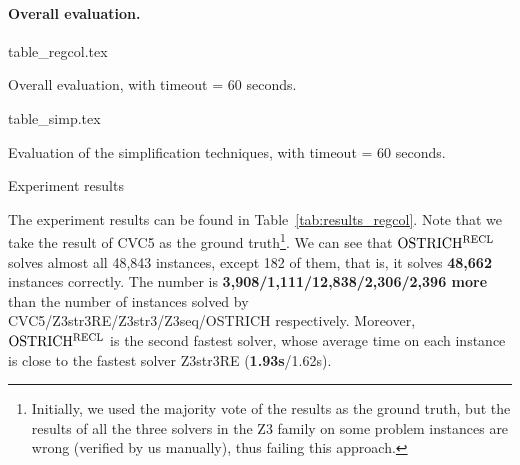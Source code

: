 \paragraph*{Overall evaluation.}
%
\vspace{-7mm}
\begin{table}
  \centering
  \begin{subtable}{0.513\textwidth}
      \centering
      {table_regcol.tex}
      \caption{Overall evaluation, with timeout = 60 seconds.}
      \label{tab:results_regcol}
  \end{subtable}
  \begin{subtable}{0.477\textwidth}
      \centering
      {table_simp.tex}
      \caption{Evaluation of the simplification techniques, with timeout = 60 seconds.}
      \label{tab:results_simp}
  \end{subtable}
  \vspace{-2mm}
  \caption{Experiment results}
\end{table}
\vspace{-7mm}

The experiment results can be found in Table~\ref{tab:results_regcol}. Note that we take the result of CVC5 as the ground truth\footnote{Initially,  we used the majority vote of the results as the ground truth, but the results of all the three solvers in the Z3 family on some problem instances are wrong (verified by us manually), thus failing this approach.}. We can see that $\rm OSTRICH^{RECL}$ solves almost all 48,843 instances, except 182 of them, that is, it solves \textbf{48,662} instances correctly. The number is %
\textbf{3,908/1,111/12,838/2,306/2,396 more} than the number of instances solved by CVC5/Z3str3RE/Z3str3/Z3seq/OSTRICH respectively.
%      
%
Moreover, $\rm OSTRICH^{RECL}$ is the second fastest solver, whose average time on each instance is close to the fastest solver Z3str3RE (\textbf{1.93s}/1.62s).


